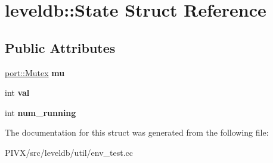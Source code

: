\hypertarget{structleveldb_1_1_state}{}\section{leveldb\+:\+:State Struct Reference}
\label{structleveldb_1_1_state}
\subsection*{Public Attributes}
\begin{DoxyCompactItemize}
\item 
\mbox{\label{structleveldb_1_1_state_aa5b0e460a6a87debeb211c47dce8ddd3}} 
\mbox{\hyperlink{classleveldb_1_1port_1_1_mutex}{port\+::\+Mutex}} {\bfseries mu}
\item 
\mbox{\label{structleveldb_1_1_state_adfc3479f732e7396e735991e48963981}} 
int {\bfseries val}
\item 
\mbox{\label{structleveldb_1_1_state_a6e84d8550d17c6c3edda2e114a634e61}} 
int {\bfseries num\+\_\+running}
\end{DoxyCompactItemize}


The documentation for this struct was generated from the following file\+:\begin{DoxyCompactItemize}
\item 
P\+I\+V\+X/src/leveldb/util/env\+\_\+test.\+cc\end{DoxyCompactItemize}
